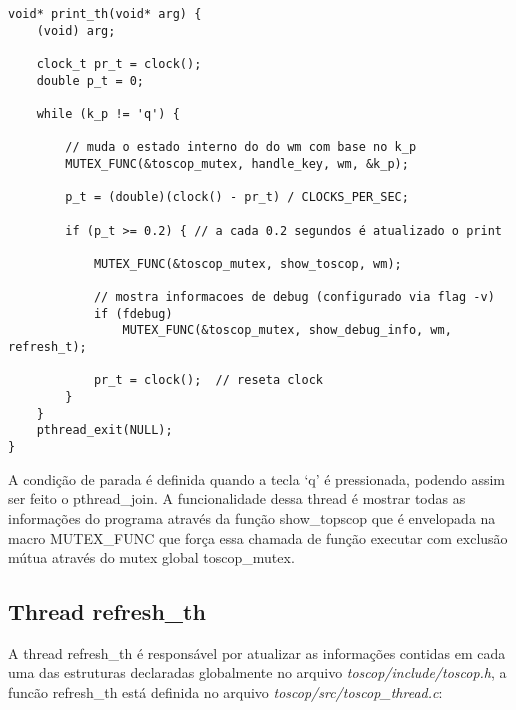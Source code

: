 \documentclass{article}
\begin{document}
\begin{verbatim}
void* print_th(void* arg) {
    (void) arg; 

    clock_t pr_t = clock();
    double p_t = 0;

    while (k_p != 'q') {

        // muda o estado interno do do wm com base no k_p
        MUTEX_FUNC(&toscop_mutex, handle_key, wm, &k_p);

        p_t = (double)(clock() - pr_t) / CLOCKS_PER_SEC;

        if (p_t >= 0.2) { // a cada 0.2 segundos é atualizado o print
       
            MUTEX_FUNC(&toscop_mutex, show_toscop, wm);
         
            // mostra informacoes de debug (configurado via flag -v)
            if (fdebug)
                MUTEX_FUNC(&toscop_mutex, show_debug_info, wm, refresh_t);

            pr_t = clock();  // reseta clock
        } 
    }
    pthread_exit(NULL);
}
\end{verbatim}

A condição de parada é definida quando a tecla `q' é pressionada, 
podendo assim ser feito o pthread\_join. A funcionalidade dessa thread 
é mostrar todas as informações do programa através da função show\_topscop 
que é envelopada na macro MUTEX\_FUNC que força essa chamada de função
executar com exclusão mútua através do mutex global toscop\_mutex.

\pagebreak

\subsection{Thread refresh\_th}

A thread refresh\_th é responsável por atualizar as informações contidas em cada
uma das estruturas declaradas globalmente no arquivo \textit{toscop/include/toscop.h}, 
a funcão refresh\_th está definida no arquivo \textit{toscop/src/toscop\_thread.c}:
\end{document}
